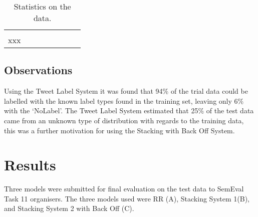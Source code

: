 \documentclass[11pt,letterpaper]{article}
\begin{document}
\begin{table}[ht!]
\begin{tabular}{lrrrrrrr}
                          &     & & \\
xxx\\
\end{tabular}
\caption{Statistics on the data.}
\label{tbl:data}
\end{table}

\subsection{Observations}
Using the Tweet Label System it was found that 94\% of the trial data could be labelled with the known label types found in the training set, leaving only 6\% with the `NoLabel'. The Tweet Label System estimated that 25\% of the test data came from an unknown type of distribution with regards to the training data, this was a further motivation for using the Stacking with Back Off System. 


\section{Results}
\label{sec:results}

Three models were submitted for final evaluation on the test data to SemEval Task 11 organisers. The three models used were RR (A), Stacking System 1(B), and Stacking System 2 with Back Off (C).

\begin{table}[ht!]
\caption{Submission System Overall Results.}
\label{tbl:submissionsOverall}
\end{table}

\begin{table}[ht!]
\caption{Submission System Cosine Results for types of Language.}
\label{tbl:submissionsCosineBreakdown}
\end{table}
\end{document}
